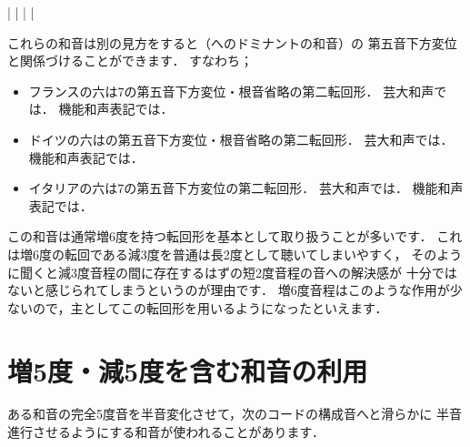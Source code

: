 \documentclass[dvipdfmx,uplatex,b5paper,openany,jbase=12Q,nomag*,textwidth-limit=44%
               ]{gachimuchi}[2020/05/05]
\begin{document}
\begin{Music}
  \generalmeter{\meterC}%
  \Startpiece
  \znotes%
  |%
  \en%
  \NOTes%
  |%
  \en\doublebar%
  \NOTes%
  |%
  \en\doublebar%
  \NOTes%
  |%
  \en\setdoublebar%
  \endpiece%
\end{Music}
\begin{Yodan}
  これらの和音は別の見方をすると\Gnii{}（\Gnv へのドミナントの和音）の
  第五音下方変位と関係づけることができます．
  すなわち；
  \begin{itemize}
    \item
      フランスの六は\Gnii\subsc7の第五音下方変位・根音省略の第二転回形．
      芸大和声では\onChordsc{\dAlt{\Slash{\Gnv}}}{\Gnv}．
      機能和声表記では．
    \item
      ドイツの六は\Gnii{}の第五音下方変位・根音省略の第二転回形．
      芸大和声では\onChordsc{\dAlt{\Slash{\Gnv}}}{\Gnv}．
      機能和声表記では．
    \item
      イタリアの六は\Gnii\subsc7の第五音下方変位の第二転回形．
      芸大和声では\onChordsc{\dAlt{\Gnv}}{\Gnv}．
      機能和声表記では．
  \end{itemize}
\end{Yodan}
\begin{Yodan}
  この和音は通常増6度を持つ転回形を基本として取り扱うことが多いです．
  これは増6度の転回である減3度を普通は長2度として聴いてしまいやすく，
  そのように聞くと減3度音程の間に存在するはずの短2度音程の音への解決感が
  十分ではないと感じられてしまうというのが理由です．
  増6度音程はこのような作用が少ないので，主としてこの転回形を用いるようになったといえます．
\end{Yodan}
\section{増5度・減5度を含む和音の利用}
ある和音の完全5度音を半音変化させて，次のコードの構成音へと滑らかに
半音進行させるようにする和音が使われることがあります．
\end{document}
